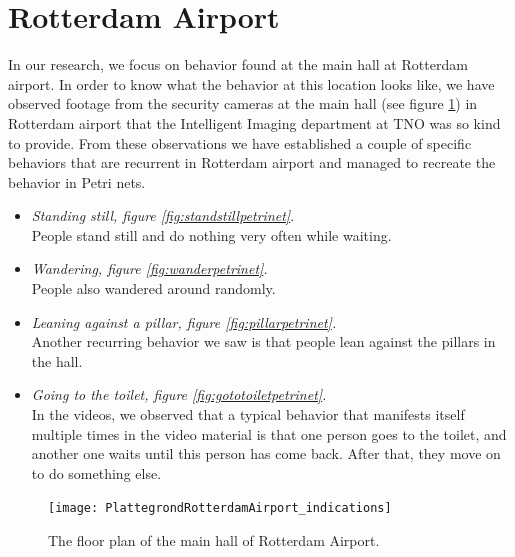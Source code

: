 \documentclass[11pt, a4paper]{book}
\begin{document}
\section{Rotterdam Airport}
\label{sec:rotterdamAirportMethod}
In our research, we focus on behavior found at the main hall at Rotterdam airport. In order to know what the behavior at this location looks like, we have observed footage from the security cameras at the main hall (see figure \ref{fig:airporttransit}) in Rotterdam airport that the Intelligent Imaging department at TNO was so kind to provide. From these observations we have established a couple of specific behaviors that are recurrent in Rotterdam airport and managed to recreate the behavior in Petri nets.
\begin{itemize}
\item \emph{Standing still, figure \ref{fig:standstillpetrinet}}.\\
People stand still and do nothing very often while waiting.

\item \emph{Wandering, figure \ref{fig:wanderpetrinet}.}\\
People also wandered around randomly.

\item \emph{Leaning against a pillar, figure \ref{fig:pillarpetrinet}.}
\\Another recurring behavior we saw is that people lean against the pillars in the hall. 

\item \emph{Going to the toilet, figure \ref{fig:gototoiletpetrinet}.}
\\In the videos, we observed that a typical behavior that manifests itself multiple times in the video material is that one person goes to the toilet, and another one waits until this person has come back. After that, they move on to do something else.
\end{itemize}

\begin{figure}
\centering            
\texttt{[image: PlattegrondRotterdamAirport\_indications]}
\caption{The floor plan of the main hall of Rotterdam Airport.}
\label{fig:airporttransit}
\end{figure}
\end{document}
